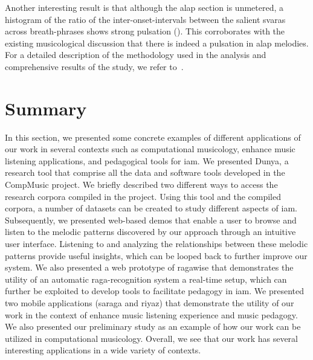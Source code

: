Another interesting result is that although the \gls{alap} section is unmetered, a histogram of the ratio of the inter-onset-intervals between the salient \glspl{svara} across breath-phrases shows strong pulsation (). This corroborates with the existing musicological discussion that there is indeed a pulsation in \gls{alap} melodies. For a detailed description of the methodology used in the analysis and comprehensive results of the study, we refer to~\cite{kaustuv_ismir_2016}.

\section{Summary}
\label{sec:applications_summary}

In this section, we presented some concrete examples of different applications of our work in several contexts such as computational musicology, enhance music listening applications, and pedagogical tools for \gls{iam}. We presented Dunya, a research tool that comprise all the data and software tools developed in the CompMusic project. We briefly described two different ways to access the research corpora compiled in the project. Using this tool and the compiled corpora, a number of datasets can be created to study different aspects of \gls{iam}. Subsequently, we presented web-based demos that enable a user to browse and listen to the melodic patterns discovered by our approach through an intuitive user interface. Listening to and analyzing the relationships between these melodic patterns provide useful insights, which can be looped back to further improve our system. We also presented a web prototype of \gls{ragawise} that demonstrates the utility of an automatic raga-recognition system a real-time setup, which can further be exploited to develop tools to facilitate pedagogy in \gls{iam}. We presented two mobile applications (\gls{saraga} and \gls{riyaz}) that demonstrate the utility of our work in the context of enhance music listening experience and music pedagogy. We also presented our preliminary study as an example of how our work can be utilized in computational musicology. Overall, we see that our work has several interesting applications in a wide variety of contexts.

